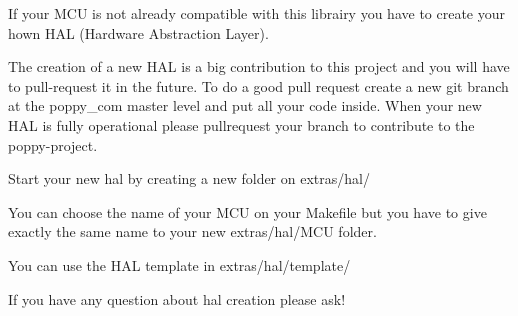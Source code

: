 If your M\-C\-U is not already compatible with this librairy you have to create your hown H\-A\-L (Hardware Abstraction Layer).

The creation of a new H\-A\-L is a big contribution to this project and you will have to pull-\/request it in the future. To do a good pull request create a new git branch at the poppy\-\_\-com master level and put all your code inside. When your new H\-A\-L is fully operational please pullrequest your branch to contribute to the poppy-\/project.

Start your new hal by creating a new folder on extras/hal/

You can choose the name of your M\-C\-U on your Makefile but you have to give exactly the same name to your new extras/hal/\-M\-C\-U folder.

You can use the H\-A\-L template in extras/hal/template/

If you have any question about hal creation please ask! 